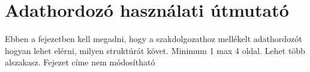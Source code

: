 \chapter*{Adathordozó használati útmutató}

Ebben a fejezetben kell megadni, hogy a szakdolgozathoz mellékelt adathordozót hogyan lehet elérni, milyen struktúrát követ. Minimum 1 max 4 oldal. Lehet több alszakasz. Fejezet címe nem módosítható